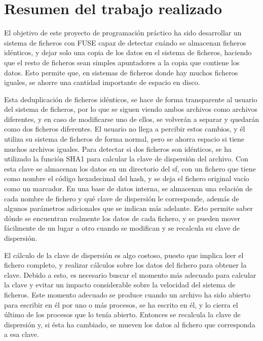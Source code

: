 \documentclass[12pt,a4paper]{article}
\begin{document}

\tableofcontents
\newpage
\section{Resumen del trabajo realizado}

El objetivo de este proyecto de programación práctico ha sido desarrollar un sistema de ficheros con FUSE capaz de detectar cuándo se almacenan ficheros idénticos, y dejar solo una copia de los datos en el sistema de ficheros, haciendo que el resto de ficheros sean simples apuntadores a la copia que contiene los datos. Esto permite que, en sistemas de ficheros donde hay muchos ficheros iguales, se ahorre una cantidad importante de espacio en disco.

Esta deduplicación de ficheros idénticos, se hace de forma transparente al usuario del sistema de ficheros, por lo que se siguen viendo ambos archivos como archivos diferentes, y en caso de modificarse uno de ellos, se volverán a separar y quedarán como dos ficheros diferentes. El usuario no llega a percibir estos cambios, y él utiliza su sistema de ficheros de forma normal, pero se ahorra espacio si tiene muchos archivos iguales.
Para detectar si dos ficheros son idénticos, se ha utilizado la función SHA1 para calcular la clave de dispersión del archivo. Con esta clave se almacenan los datos en un directorio del sf, con un fichero que tiene como nombre el código hexadecimal del hash, y se deja el fichero original vacío como un marcador. En una base de datos interna, se almacenan una relación de cada nombre de fichero y qué clave de dispersión le corresponde, además de algunos parámetros adicionales que se indican más adelante. Esto permite saber dónde se encuentran realmente los datos de cada fichero, y se pueden mover fácilmente de un lugar a otro cuando se modifican y se recalcula su clave de dispersión.

El cálculo de la clave de dispersión es algo costoso, puesto que implica leer el fichero completo, y realizar cálculos sobre los datos del fichero para obtener la clave. Debido a esto, es necesario buscar el momento más adecuado para calcular la clave y evitar un impacto considerable sobre la velocidad del sistema de ficheros. Este momento adecuado se produce cuando un archivo ha sido abierto para escribir en él por uno o más procesos, se ha escrito en él, y lo cierra el último de los procesos que lo tenía abierto. Entonces se recalcula la clave de dispersión y, si ésta ha cambiado, se mueven los datos al fichero que corresponda a esa clave.
\end{document}

